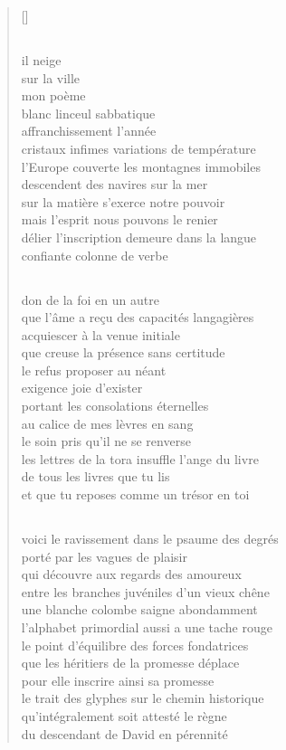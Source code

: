 \documentclass[a4paper, titlepage, twoside, 12pt]{book}
\begin{document}
\begin{verse}[\versewidth]
\subsection*{}
il neige\\
sur la ville\\
mon poème\\
blanc linceul sabbatique\\
affranchissement l'année\\
cristaux infimes variations de température\\
l'Europe couverte les montagnes immobiles\\
descendent des navires sur la mer\\
sur la matière s'exerce notre pouvoir\\
mais l'esprit nous pouvons le renier\\
délier l'inscription demeure dans la langue\\
confiante colonne de verbe
\subsection*{}
don de la foi en un autre\\
que l'âme a reçu des capacités langagières\\
acquiescer à la venue initiale\\
que creuse la présence sans certitude\\
le refus proposer au néant\\
exigence joie d'exister\\
portant les consolations éternelles\\
au calice de mes lèvres en sang\\
le soin pris qu'il ne se renverse\\
les lettres de la tora insuffle l'ange du livre\\
de tous les livres que tu lis\\
et que tu reposes comme un trésor en toi
\subsection*{}
voici le ravissement dans le psaume des degrés\\
porté par les vagues de plaisir\\
qui découvre aux regards des amoureux\\
entre les branches juvéniles d'un vieux chêne\\
une blanche colombe saigne abondamment\\
l'alphabet primordial aussi a une tache rouge\\
le point d'équilibre des forces fondatrices\\
que les héritiers de la promesse déplace\\
pour elle inscrire ainsi sa promesse\\
le trait des glyphes sur le chemin historique\\
qu'intégralement soit attesté le règne\\
du descendant de David en pérennité
\end{verse}
\end{document}
